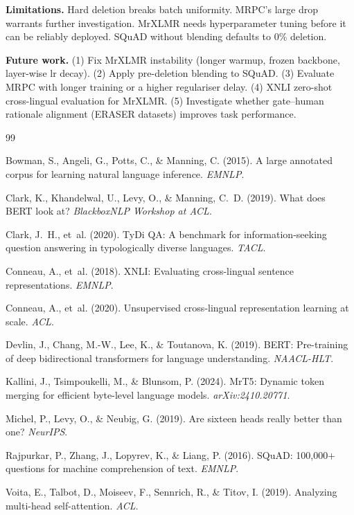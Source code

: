 \documentclass[11pt,a4paper]{article}
\begin{document}
\textbf{Limitations.} Hard deletion breaks batch uniformity. MRPC's large drop warrants further investigation. MrXLMR needs hyperparameter tuning before it can be reliably deployed. SQuAD without blending defaults to 0\% deletion.

\textbf{Future work.} (1) Fix MrXLMR instability (longer warmup, frozen backbone, layer-wise lr decay). (2) Apply pre-deletion blending to SQuAD. (3) Evaluate MRPC with longer training or a higher regulariser delay. (4) XNLI zero-shot cross-lingual evaluation for MrXLMR. (5) Investigate whether gate--human rationale alignment (ERASER datasets) improves task performance.



\begin{thebibliography}{99}

Bowman, S., Angeli, G., Potts, C., \& Manning, C. (2015). A large annotated corpus for learning natural language inference. \emph{EMNLP}.

Clark, K., Khandelwal, U., Levy, O., \& Manning, C.~D. (2019). What does {BERT} look at? \emph{BlackboxNLP Workshop at ACL}.

Clark, J.~H., et~al. (2020). {TyDi QA}: A benchmark for information-seeking question answering in typologically diverse languages. \emph{TACL}.

Conneau, A., et~al. (2018). {XNLI}: Evaluating cross-lingual sentence representations. \emph{EMNLP}.

Conneau, A., et~al. (2020). Unsupervised cross-lingual representation learning at scale. \emph{ACL}.

Devlin, J., Chang, M.-W., Lee, K., \& Toutanova, K. (2019). {BERT}: Pre-training of deep bidirectional transformers for language understanding. \emph{NAACL-HLT}.

Kallini, J., Tsimpoukelli, M., \& Blunsom, P. (2024). {MrT5}: Dynamic token merging for efficient byte-level language models. \emph{arXiv:2410.20771}.

Michel, P., Levy, O., \& Neubig, G. (2019). Are sixteen heads really better than one? \emph{NeurIPS}.

Rajpurkar, P., Zhang, J., Lopyrev, K., \& Liang, P. (2016). {SQuAD}: 100,000+ questions for machine comprehension of text. \emph{EMNLP}.

Voita, E., Talbot, D., Moiseev, F., Sennrich, R., \& Titov, I. (2019). Analyzing multi-head self-attention. \emph{ACL}.

\end{thebibliography}
\end{document}
